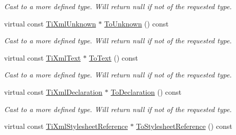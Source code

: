 \begin{DoxyCompactItemize}
\begin{DoxyCompactList}\small\item\em Cast to a more defined type. Will return null if not of the requested type. \item\end{DoxyCompactList}\item 
\hypertarget{class_ti_xml_node_afd7205cf31d7a376929f8a36930627a2}{
virtual const \hyperlink{class_ti_xml_unknown}{TiXmlUnknown} $\ast$ \hyperlink{class_ti_xml_node_afd7205cf31d7a376929f8a36930627a2}{ToUnknown} () const }
\label{class_ti_xml_node_afd7205cf31d7a376929f8a36930627a2}

\begin{DoxyCompactList}\small\item\em Cast to a more defined type. Will return null if not of the requested type. \item\end{DoxyCompactList}\item 
\hypertarget{class_ti_xml_node_a95a46a52c525992d6b4ee08beb14cd69}{
virtual const \hyperlink{class_ti_xml_text}{TiXmlText} $\ast$ \hyperlink{class_ti_xml_node_a95a46a52c525992d6b4ee08beb14cd69}{ToText} () const }
\label{class_ti_xml_node_a95a46a52c525992d6b4ee08beb14cd69}

\begin{DoxyCompactList}\small\item\em Cast to a more defined type. Will return null if not of the requested type. \item\end{DoxyCompactList}\item 
\hypertarget{class_ti_xml_node_a9f43e6984fc7d4afd6eb32714c6b7b72}{
virtual const \hyperlink{class_ti_xml_declaration}{TiXmlDeclaration} $\ast$ \hyperlink{class_ti_xml_node_a9f43e6984fc7d4afd6eb32714c6b7b72}{ToDeclaration} () const }
\label{class_ti_xml_node_a9f43e6984fc7d4afd6eb32714c6b7b72}

\begin{DoxyCompactList}\small\item\em Cast to a more defined type. Will return null if not of the requested type. \item\end{DoxyCompactList}\item 
\hypertarget{class_ti_xml_node_adaae9aab50ab8a66751774c1f1f685bd}{
virtual const \hyperlink{class_ti_xml_stylesheet_reference}{TiXmlStylesheetReference} $\ast$ \hyperlink{class_ti_xml_node_adaae9aab50ab8a66751774c1f1f685bd}{ToStylesheetReference} () const }
\label{class_ti_xml_node_adaae9aab50ab8a66751774c1f1f685bd}


\end{DoxyCompactItemize}
